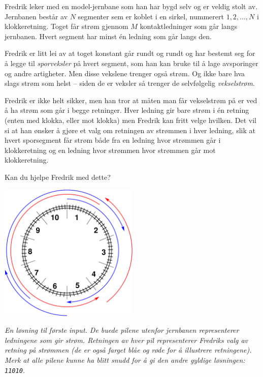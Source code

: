 \ifx\boi\undefined\fi
\def\version{jury-1}
Fredrik leker med en model-jernbane som han har bygd selv og er veldig stolt av.
Jernbanen består av $N$ segmenter sem er koblet i en sirkel, nummerert $1, 2, \dots, N$ i klokkeretning.
Toget får strøm gjennom $M$ kontaktledninger som går langs jernbanen. Hvert segment har minst én ledning som går langs den.

Fredrik er litt lei av at toget konstant går rundt og rundt og har bestemt seg for å legge til \emph{sporveksler} på hvert segment, som han kan bruke til å lage avsporinger og andre artigheter.
Men disse vekslene trenger også strøm. Og ikke bare hva slags strøm som helst -- siden de er veksler så trenger de selvfølgelig \emph{vekselstrøm}.

Fredrik er ikke helt sikker, men han tror at måten man får vekselstrøm på er ved å ha strøm som går i begge retninger. Hver
ledning gir bare strøm i én retning (enten med klokka, eller mot klokka) men Fredrik kan fritt velge hvilken.
Det vil si at han ønsker å gjøre et valg om retningen av strømmen i hver ledning, slik at hvert sporsegment får strøm
både fra en ledning hvor strømmen går i klokkeretning og en ledning hvor strømmen hvor strømmen går mot klokkeretning.

Kan du hjelpe Fredrik med dette?

\vspace{2mm}
\begin{center}
\includegraphics[width=0.5\textwidth]{alternatingfig.pdf}
\end{center}
\vspace{1mm}
{\em En løsning til første input. De buede pilene utenfor jernbanen representerer ledningene som gir strøm.
Retningen av hver pil representerer Fredriks valg av retning på strømmen (de er også farget blåe og røde for
å illustrere retningene). Merk at alle pilene kunne ha blitt snudd for å gi den andre gyldige løsningen: \texttt{11010}.}

